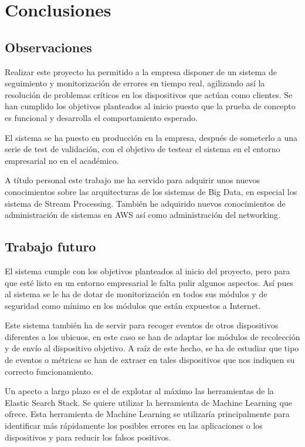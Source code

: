 \chapter{Conclusiones}

\section{Observaciones}

Realizar este proyecto ha permitido a la empresa disponer de un sistema de seguimiento y monitorización de errores en tiempo real, agilizando así la resolución de problemas críticos en los dispositivos que actúan como clientes. Se han cumplido los objetivos planteados al inicio puesto que la prueba de concepto es funcional y desarrolla el comportamiento esperado.

El sistema se ha puesto en producción en la empresa, después de someterlo a una serie de test de validación, con el objetivo de testear el sistema en el entorno empresarial no en el académico.

A título personal este trabajo me ha servido para adquirir unos nuevos conocimientos sobre las arquitecturas de los sistemas de Big Data, en especial los sistema de Stream Processing. También he adquirido nuevos conocimientos de administración de sistemas en AWS así como administración del networking.

\section{Trabajo futuro}

El sistema cumple con los objetivos planteados al inicio del proyecto, pero para que esté listo en un entorno empresarial le falta pulir algunos aspectos.
Así pues al sistema se le ha de dotar de monitorización en todos sus módulos y de seguridad como mínimo en los módulos que están expuestos a Internet.

Este sistema también ha de servir para recoger eventos de otros dispositivos diferentes a los ubicuos, en este caso se han de adaptar los módulos de recolección y de envío al dispositivo objetivo. A raíz de este hecho, se ha de estudiar que tipo de eventos o métricas se han de extraer en tales dispositivos que nos indiquen su correcto funcionamiento.

Un apecto a largo plazo es el de explotar al máximo las herramientas de la Elastic Search Stack. Se quiere utilizar la herramienta de Machine Learning que ofrece. Esta herramienta de Machine Learning se utilizaría principalmente para identificar más rápidamente los posibles errores en las aplicaciones o los dispositivos y para reducir los falsos positivos.




